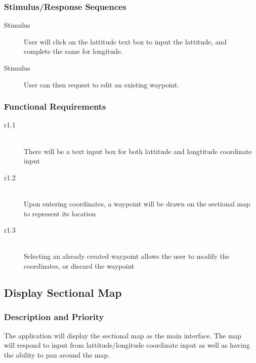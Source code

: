 \documentclass[12pt, letterpaper]{article}
\begin{document}
      \subsubsection{Stimulus/Response Sequences}
        \begin{description}
          \item[Stimulus] User will click on the lattitude text box to input the
  			lattitude, and complete the same for longitude.
  		\item[Stimulus] User can then request to edit an existing waypoint.
    \end{description}
      \subsubsection{Functional Requirements}
        \begin{description}
          \item[r1.1] \hfill \\ There will be a text input box for both lattitude and longtitude coordinate input\\ 
          \item[r1.2] \hfill \\ Upon entering coordinates, a waypoint will be drawn on the sectional map to represent its location\\ 
          \item[r1.3] \hfill \\ Selecting an already created waypoint allows the user to modify the coordinates, or discard the waypoint\\ 
        \end{description}
  \subsection{Display Sectional Map}
    \subsubsection{Description and Priority}
      The application will display the sectional map as the main interface.
      The map will respond to input from lattitude/longitude coordinate input as well
      as having the ability to pan around the map.
\end{document}
